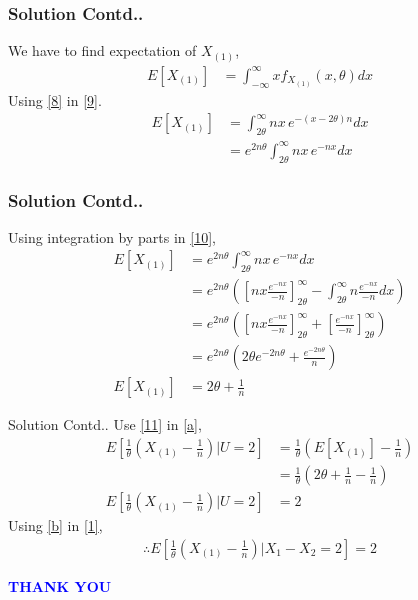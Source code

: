 \documentclass{beamer}
\providecommand{\sbrak}[1]{\ensuremath{{}\left[#1\right]}}
\providecommand{\brak}[1]{\ensuremath{\left(#1\right)}}
\begin{document}
\begin{frame}
 \frametitle{Solution Contd..}
 We have to find expectation of $X_{(1)}$,
\begin{align}
   E\sbrak{X_{(1)}}&=\int_{-\infty}^{\infty} x f_{X_{(1)}}{(x,\theta)} dx \label{9}
\end{align}
Using \eqref{8} in \eqref{9}.
\begin{align}
\nonumber E\sbrak{X_{(1)}}&=\int_{2\theta}^{\infty} n x\,e^{-(x-2\theta)n} dx\\
  &= e^{2n\theta}\int_{2\theta}^{\infty} n x\,e^{-n x} dx \label{10}
\end{align}
\end{frame}
 
 \begin{frame}
 \frametitle{Solution Contd..}
 Using integration by parts in \eqref{10},
\begin{align}
    \nonumber E\sbrak{X_{(1)}}
  &= e^{2n\theta}\int_{2\theta}^{\infty}nx\,e^{-n x}dx\\
      \nonumber &= e^{2n\theta}\brak{\sbrak{n x \frac{e^{-n x}}{-n}}_{2\theta}^{\infty}-\int_{2\theta}^{\infty} n \frac{e^{-n x}}{-n}dx}\\
  \nonumber &= e^{2n\theta}\brak{\sbrak{n x \frac{e^{-n x}}{-n}}_{2\theta}^{\infty}+\sbrak{\frac{e^{-n x}}{-n}}_{2\theta}^{\infty}}\\
  \nonumber &= e^{2n\theta}\brak{2\theta e^{-2n\theta}+\frac{e^{-2n\theta}}{n}}\\
  E\sbrak{X_{(1)}} &= 2\theta+\frac{1}{n}\label{11}
\end{align}
 \end{frame}
\begin{frame}{Solution Contd..}
    Use \eqref{11} in \eqref{a},
\begin{align}
   \nonumber E\sbrak{\frac{1}{\theta}\brak{X_{(1)}-\frac{1}{n}}|U=2}
    &=\frac{1}{\theta}\brak{E\sbrak{X_{(1)}}-\frac{1}{n}}\\
   \nonumber &=\frac{1}{\theta}\brak{2\theta+\frac{1}{n}-\frac{1}{n}}\\
   E\sbrak{\frac{1}{\theta}\brak{X_{(1)}-\frac{1}{n}}|U=2} &= 2\label{b}
\end{align}
Using \eqref{b} in \eqref{1},
\begin{align}
     \nonumber\therefore   E\sbrak{\frac{1}{\theta}\brak{X_{(1)}-\frac{1}{n}}|X_1-X_2=2}=2
\end{align}
\end{frame}
\begin{frame}
   \centering
    \textcolor{blue}{\Huge{\textbf{THANK YOU}}}
\end{frame}
\end{document}
